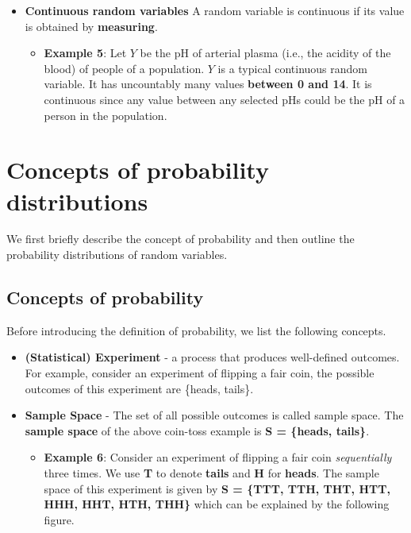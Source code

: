 \documentclass[
]{book}
\providecommand{\tightlist}{%
  \setlength{\itemsep}{0pt}\setlength{\parskip}{0pt}}
\begin{document}
\begin{itemize}
\item
  \textbf{Continuous random variables} A random variable is continuous if its value is obtained by \textbf{measuring}.

  \begin{itemize}
  \tightlist
  \item
    \textbf{Example 5}: Let \(Y\) be the pH of arterial plasma (i.e., the acidity of the blood) of people of a population. \(Y\) is a typical continuous random variable. It has uncountably many values \textbf{between 0 and 14}. It is continuous since any value between any selected pHs could be the pH of a person in the population.
  \end{itemize}
\end{itemize}

\hypertarget{concepts-of-probability-distributions-1}{%
\section{Concepts of probability distributions}\label{concepts-of-probability-distributions-1}}

We first briefly describe the concept of probability and then outline the probability distributions of random variables.

\hypertarget{concepts-of-probability}{%
\subsection{Concepts of probability}\label{concepts-of-probability}}

Before introducing the definition of probability, we list the following concepts.

\begin{itemize}
\item
  \textbf{(Statistical) Experiment} - a process that produces well-defined outcomes. For example, consider an experiment of flipping a fair coin, the possible outcomes of this experiment are \{heads, tails\}.
\item
  \textbf{Sample Space} - The set of all possible outcomes is called sample space. The \textbf{sample space} of the above coin-toss example is \textbf{S = \{heads, tails\}}.

  \begin{itemize}
  \tightlist
  \item
    \textbf{Example 6}: Consider an experiment of flipping a fair coin \emph{sequentially} three times. We use \textbf{T} to denote \textbf{tails} and \textbf{H} for \textbf{heads}. The sample space of this experiment is given by \textbf{S = \{TTT, TTH, THT, HTT, HHH, HHT, HTH, THH\}} which can be explained by the following figure.
  \end{itemize}
\end{itemize}
\end{document}
